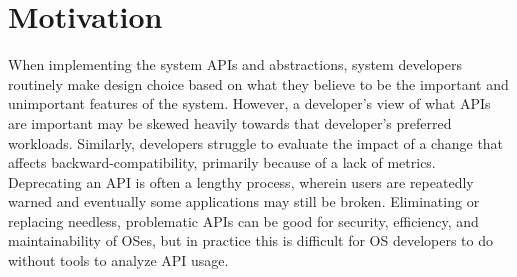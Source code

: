 \section{Motivation}

When implementing the system APIs and abstractions,
system developers routinely make design choice based on
what they believe to be the important and unimportant features of the system.
However, a developer's view of what APIs are important
may be skewed heavily towards that developer's preferred workloads.
Similarly, developers struggle to evaluate the impact of a 
change that affects backward-compatibility,
primarily because of a lack of metrics.
Deprecating an API is often a lengthy process, wherein
users are repeatedly warned 
and eventually some applications may still be broken.
Eliminating or replacing needless, problematic APIs 
can be good for security, efficiency, and maintainability of OSes,
but in practice this is difficult for OS developers to do without tools to analyze API usage.


